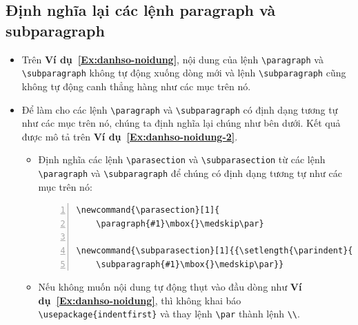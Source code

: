 \documentclass[12pt,a4paper]{article}
\newcommand{\parasection}[1]{\paragraph{#1}\mbox{}\medskip\par}
\newcommand{\subparasection}[1]{{\setlength{\parindent}{0pt}\subparagraph{#1}\mbox{}\medskip \par}}
\newcommand{\ex}[1]{\textbf{Ví dụ~#1}}
\begin{document}
\subsection{Định nghĩa lại các lệnh paragraph và subparagraph}
	\begin{itemize}
		\item Trên \ex{\ref{Ex:danhso-noidung}}, nội dung của lệnh \Verb|\paragraph| và \Verb|\subparagraph| không tự động xuống dòng mới và lệnh \Verb|\subparagraph| cũng không tự động canh thẳng hàng như các mục trên nó.
		
		\item Để làm cho các lệnh \Verb|\paragraph| và \Verb|\subparagraph| có định dạng tương tự như các mục trên nó, chúng ta định nghĩa lại chúng như bên dưới. Kết quả được mô tả trên \ex{\ref{Ex:danhso-noidung-2}}.
			\begin{itemize}
				\item Định nghĩa các lệnh \Verb|\parasection| và \Verb|\subparasection| từ các lệnh \Verb|\paragraph| và \Verb|\subparagraph| để chúng có định dạng tương tự như các mục trên nó:
\begin{Verbatim}[xleftmargin=10mm, numbers=left]
\newcommand{\parasection}[1]{
	\paragraph{#1}\mbox{}\medskip\par}

\newcommand{\subparasection}[1]{{\setlength{\parindent}{0pt}
	\subparagraph{#1}\mbox{}\medskip\par}}
\end{Verbatim}

				\item Nếu không muốn nội dung tự động thụt vào đầu dòng như \ex{\ref{Ex:danhso-noidung}}, thì không khai báo \Verb|\usepackage{indentfirst}| và thay lệnh \Verb|\par| thành lệnh \Verb|\\|.


\end{itemize}
\end{itemize}
\end{document}
